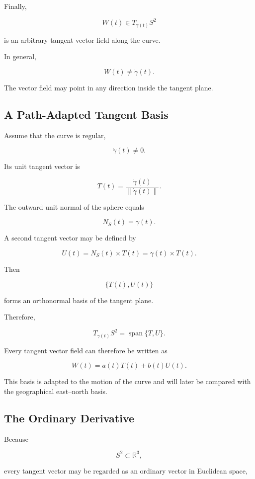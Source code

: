 \documentclass[12pt,a4paper]{article}
\theoremstyle{notespace}
\begin{document}
Finally,

\[
W(t)\in T_{\gamma(t)}S^2
\]

is an arbitrary tangent vector field along the curve.

In general,

\[
W(t)\neq\dot\gamma(t).
\]

The vector field may point in any direction inside the tangent plane.

\subsection{A Path-Adapted Tangent Basis}

Assume that the curve is regular,

\[
\dot\gamma(t)\neq0.
\]

Its unit tangent vector is

\[
T(t)
=
\frac{\dot\gamma(t)}
{\|\dot\gamma(t)\|}.
\]

The outward unit normal of the sphere equals

\[
N_S(t)=\gamma(t).
\]

A second tangent vector may be defined by

\[
U(t)
=
N_S(t)\times T(t)
=
\gamma(t)\times T(t).
\]

Then

\[
\boxed{
	\{T(t),U(t)\}
}
\]

forms an orthonormal basis of the tangent plane.

Therefore,

\[
T_{\gamma(t)}S^2
=
\operatorname{span}\{T,U\}.
\]

Every tangent vector field can therefore be written as

\[
W(t)
=
a(t)T(t)+b(t)U(t).
\]

This basis is adapted to the motion of the curve and will later be compared
with the geographical east--north basis.

\subsection{The Ordinary Derivative}

Because

\[
S^2\subset\mathbb R^3,
\]

every tangent vector may be regarded as an ordinary vector in Euclidean space,
\end{document}
